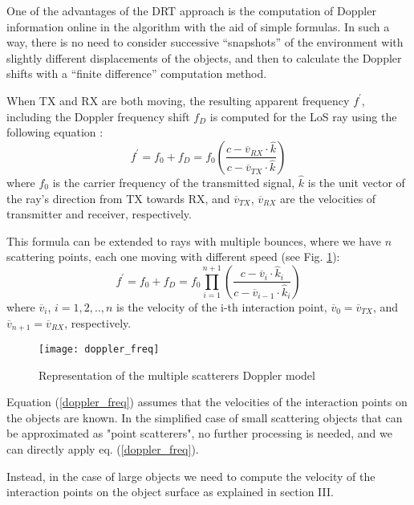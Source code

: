 One of the advantages of the DRT approach is the computation of Doppler information online in the algorithm with the aid of simple formulas. In such a way, there is no need to consider successive “snapshots” of the environment with slightly different displacements of the objects, and then to calculate the Doppler shifts with a “finite difference” computation method. \par 
	When TX and RX are both moving, the resulting apparent frequency $f^{'}$, including the Doppler frequency shift $f_D$ is computed for the LoS ray using the following equation \cite{ChenDoppler}: 
	\begin{equation}
	f^{'} = f_{0} + f_{D} = f_{0} \left (\frac{c-\overline{v}_{RX}\cdot \hat{k}}{c-\overline{v}_{TX}\cdot \hat{k}} \right) 
	\end{equation}
	where $f_0$ is the carrier frequency of the transmitted signal, $\hat{k}$ is the unit vector of the ray's direction from TX towards RX, and $\overline{v}_{TX}$, $\overline{v}_{RX}$ are the velocities of transmitter and receiver, respectively. \par
	This formula can be extended to rays with multiple bounces, where we have $n$ scattering points, each one moving with different speed (see Fig. \ref{doppler}): 
	\begin{equation}
	f^{'} = f_{0} + f_{D} = f_{0} \prod_{i=1}^{n+1} \left(\frac{c-\overline{v}_{i}\cdot \hat{k}_i}{c-\overline{v}_{i-1}\cdot \hat{k}_i}  \right)
	\label{doppler_freq}
	\end{equation}	
    where $\overline{v}_i$, $i=1,2,..,n$ is the velocity of the i-th interaction point, $\overline{v}_0=\overline{v}_{TX}$, and $\overline{v}_{n+1}=\overline{v}_{RX}$, respectively.\par
	\begin{figure}[h!]
		\centering
		\texttt{[image: doppler\_freq]}
		\caption{Representation of the multiple scatterers Doppler model}
		\label{doppler}
	\end{figure}
	Equation (\ref{doppler_freq}) assumes that the velocities of the interaction points on the objects are known. In the simplified case of small scattering objects that can be approximated as "point scatterers", no further processing is needed, and we can directly apply eq. (\ref{doppler_freq}). \par 
	Instead, in the case of large objects we need to compute the velocity of the interaction points on the object surface as explained in section III. 